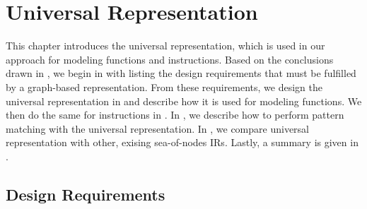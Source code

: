 %

\chapter{Universal Representation}

This chapter introduces the \gls{universal representation}, which is used in our
approach for modeling \glspl{function} and \glspl{instruction}.
%
Based on the conclusions drawn in
, we begin in
 with listing the design requirements
that must be fulfilled by a graph-based representation.
%
From these requirements, we design the \gls{universal representation} in
 and describe how it is used for modeling
\glspl{function}.
%
We then do the same for \glspl{instruction} in .
%
In , we describe how to perform
\gls{pattern matching} with the \gls{universal representation}.
%
In , we compare \gls{universal representation}
with other, exising \glspl{sea-of-nodes IR}.
%
Lastly, a summary is given in .


\section{Design Requirements}

